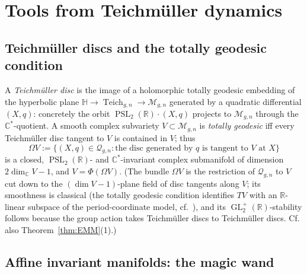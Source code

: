 \documentclass[11pt]{article}
\newcommand{\C}{\mathbb{C}}
\newcommand{\R}{\mathbb{R}}
\newcommand{\cQ}{\mathcal{Q}}
\newcommand{\M}{\mathcal{M}}
\DeclareMathOperator{\PSL}{PSL}
\DeclareMathOperator{\GL}{GL}
\DeclareMathOperator{\Teich}{Teich}
\theoremstyle{definition}
\theoremstyle{remark}
\begin{document}
\section{Tools from Teichm\"uller dynamics}
\label{sec:tools}

\subsection{Teichm\"uller discs and the totally geodesic condition}

A \emph{Teichm\"uller disc} is the image of a holomorphic totally geodesic
embedding of the hyperbolic plane
$\mathbb{H} \to \Teich_{g,n} \to \M_{g,n}$ generated by a quadratic
differential $(X,q)$: concretely the orbit $\PSL_2(\R) \cdot (X,q)$
projects to $\M_{g,n}$ through the $\C^*$-quotient. A smooth complex
subvariety $V \subset \M_{g,n}$ is \emph{totally geodesic} iff every
Teichm\"uller disc tangent to $V$ is contained in $V$; thus
\[
\Omega V := \{(X,q) \in \cQ_{g,n} : \text{the disc generated by } q
\text{ is tangent to } V \text{ at } X\}
\]
is a closed, $\PSL_2(\R)$- and $\C^*$-invariant complex submanifold of
dimension $2 \dim_{\C} V - 1$, and $V = \Phi(\Omega V)$.
(The bundle $\Omega V$ is the restriction of $\cQ_{g,n}$ to $V$ cut down
to the $(\dim V - 1)$-plane field of disc tangents along $V$; its
smoothness is classical (the totally geodesic condition identifies
$T V$ with an $\R$-linear subspace of the period-coordinate model, cf.\
\cite{Mukamel}), and its $\GL_2^+(\R)$-stability follows because the
group action takes Teichm\"uller discs to Teichm\"uller discs. Cf. also
Theorem~\ref{thm:EMM}(1).)

\subsection{Affine invariant manifolds: the magic wand}
\end{document}
